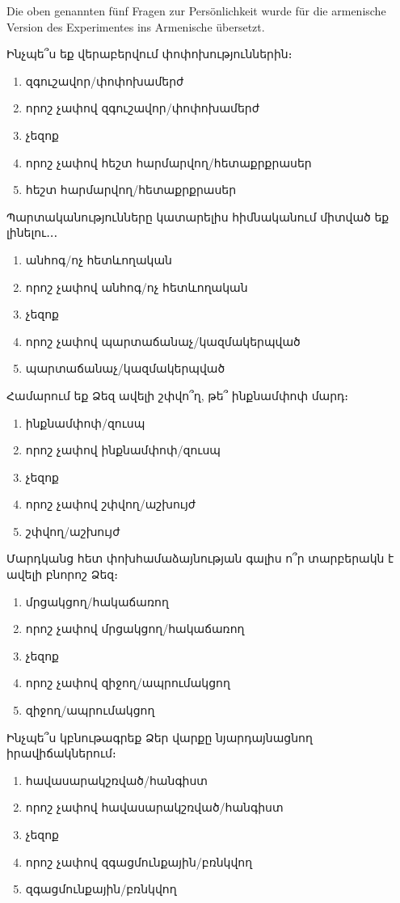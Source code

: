 \documentclass[11pt,a4paper,headsepline,twoside,toc=bibliography]{scrreprt}
\begin{document}
\noindent Die oben genannten fünf Fragen zur Persönlichkeit wurde für die armenische Version des Experimentes ins Armenische übersetzt.  

\begin{itemize}
	{\artm 
	\item Ինչպե՞ս եք վերաբերվում փոփոխություններին։
	\begin{enumerate}
		\item զգուշավոր/փոփոխամերժ
		\item որոշ չափով զգուշավոր/փոփոխամերժ
		\item չեզոք
		\item որոշ չափով հեշտ հարմարվող/հետաքրքրասեր
		\item հեշտ հարմարվող/հետաքրքրասեր
	\end{enumerate}
	\item Պարտականությունները կատարելիս հիմնականում միտված եք լինելու․․․
	\begin{enumerate}
		\item անհոգ/ոչ հետևողական		
		\item որոշ չափով անհոգ/ոչ հետևողական
		\item չեզոք
		\item որոշ չափով պարտաճանաչ/կազմակերպված
		\item պարտաճանաչ/կազմակերպված
	\end{enumerate}
	\item Համարում եք Ձեզ ավելի շփվո՞ղ, թե՞ ինքնամփոփ մարդ։
	\begin{enumerate}
		\item ինքնամփոփ/զուսպ
		\item որոշ չափով ինքնամփոփ/զուսպ
		\item չեզոք
		\item որոշ չափով շփվող/աշխույժ
		\item շփվող/աշխույժ
	\end{enumerate}
	\item Մարդկանց հետ փոխհամաձայնության գալիս ո՞ր տարբերակն է ավելի բնորոշ Ձեզ։
	\begin{enumerate}
		\item մրցակցող/հակաճառող
		\item որոշ չափով մրցակցող/հակաճառող
		\item չեզոք
		\item որոշ չափով զիջող/ապրումակցող
		\item զիջող/ապրումակցող
	\end{enumerate}
	\item Ինչպե՞ս կբնութագրեք Ձեր վարքը նյարդայնացնող իրավիճակներում։
	\begin{enumerate}
		\item հավասարակշռված/հանգիստ
		\item որոշ չափով հավասարակշռված/հանգիստ
		\item չեզոք
		\item որոշ չափով զգացմունքային/բռնկվող
		\item զգացմունքային/բռնկվող 
	\end{enumerate}
}
\end{itemize}
\end{document}
